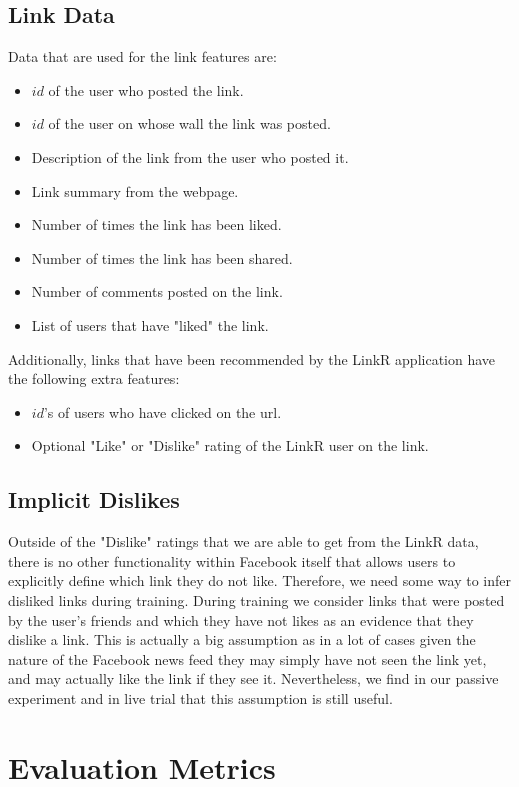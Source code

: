 \subsection{Link Data}

Data that are used for the link features are:
\begin{itemize}
\item{$id$ of the user who posted the link.}
\item{$id$ of the user on whose wall the link was posted.}
\item{Description of the link from the user who posted it.}
\item{Link summary from the webpage.}
\item{Number of times the link has been liked.}
\item{Number of times the link has been shared.}
\item{Number of comments posted on the link}.
\item{List of users that have "liked" the link.}
\end{itemize}
Additionally, links that have been recommended by the LinkR application have the following extra features:
\begin{itemize}
\item{$id$'s of users who have clicked on the url.}
\item{Optional "Like" or "Dislike" rating of the LinkR user on the link.}
\end{itemize}

\subsection{Implicit Dislikes}
Outside of the "Dislike" ratings that we are able to get from the LinkR data, there is no other functionality within Facebook itself that allows users to explicitly define which link they do not like. Therefore, we need some way to infer disliked links during training. During training we consider links that were posted by the user's friends and which they have not likes as an evidence that they dislike a link. This is actually a big assumption as in a lot of cases given the nature of the Facebook news feed they may simply have not seen the link yet, and may actually like the link if they see it. Nevertheless, we find in our passive experiment and in live trial that this assumption is still useful.


\section{Evaluation Metrics}


